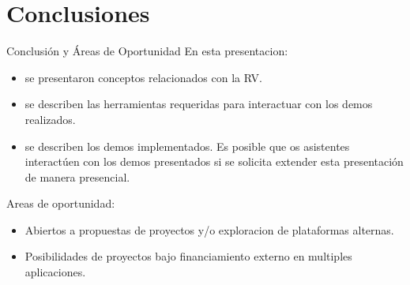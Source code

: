 \documentclass[aspectratio=169,compress]{beamer}
\begin{document}






\section[CP1]{Conclusiones }
\begin{frame}{Conclusi\'on y Áreas de Oportunidad}
En esta presentacion:
\begin{itemize}
\item se presentaron conceptos relacionados con la RV. 
\item se describen las herramientas requeridas para interactuar con los demos realizados. 
\item se describen los demos implementados. Es posible que os asistentes interactúen con los demos presentados si se solicita extender esta presentación de manera presencial.
\end{itemize}
Areas de oportunidad:
\begin{itemize}
\item Abiertos a propuestas de proyectos y/o exploracion de plataformas alternas.
\item Posibilidades de proyectos bajo financiamiento externo en multiples aplicaciones.
\end{itemize}

\end{frame}
\end{document}
